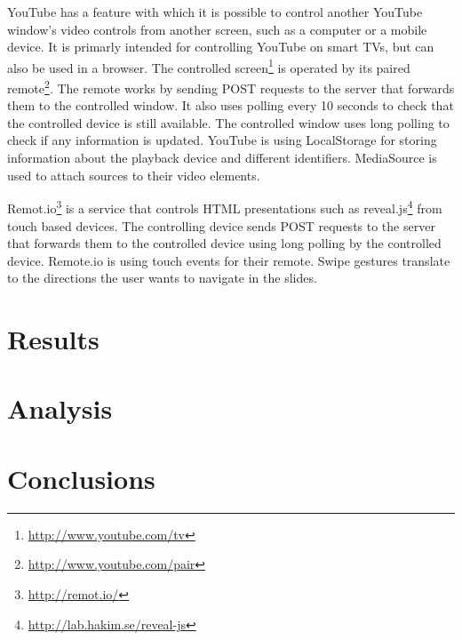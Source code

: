 \documentclass[12pt,a4paper,english,oneside]{article}
\begin{document}
\begin{multicols}{2}
YouTube has a feature with which it is possible to control another
YouTube window's video controls from another screen, such as a
computer or a mobile device. It is primarly intended for controlling
YouTube on smart TVs, but can also be used in a browser. The
controlled screen\footnote{\url{http://www.youtube.com/tv}} is
operated by its paired
remote\footnote{\url{http://www.youtube.com/pair}}. The remote works
by sending POST requests to the server that forwards them to the
controlled window. It also uses polling every 10 seconds to check that
the controlled device is still available. The controlled window uses
long polling to check if any information is updated. YouTube is using
LocalStorage for storing information about the playback device and
different identifiers. MediaSource is used to attach sources to their
video elements.

Remot.io\footnote{\url{http://remot.io/}} is a service that controls
HTML presentations such as
reveal.js\footnote{\url{http://lab.hakim.se/reveal-js}} from touch
based devices. The controlling device sends POST requests to the
server that forwards them to the controlled device using long polling
by the controlled device. Remote.io is using touch events for their
remote. Swipe gestures translate to the directions the user wants to
navigate in the slides.

\section{Results}

\section{Analysis}

\section{Conclusions}







\end{multicols}
\end{document}
